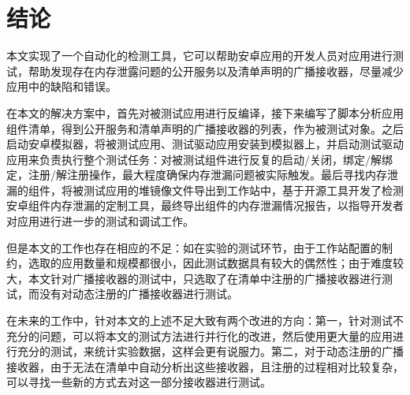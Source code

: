 \chapter{结论}\label{chapter_conclusion}
本文实现了一个自动化的检测工具，它可以帮助安卓应用的开发人员对应用进行测试，帮助发现存在内存泄露问题的公开服务以及清单声明的广播接收器，尽量减少应用中的缺陷和错误。

在本文的解决方案中，首先对被测试应用进行反编译，接下来编写了脚本分析应用组件清单，得到公开服务和清单声明的广播接收器的列表，作为被测试对象。之后启动安卓模拟器，将被测试应用、测试驱动应用安装到模拟器上，并启动测试驱动应用来负责执行整个测试任务：对被测试组件进行反复的启动/关闭，绑定/解绑定，注册/解注册操作，最大程度确保内存泄漏问题被实际触发。最后寻找内存泄漏的组件，将被测试应用的堆镜像文件导出到工作站中，基于开源工具开发了检测安卓组件内存泄漏的定制工具，最终导出组件的内存泄漏情况报告，以指导开发者对应用进行进一步的测试和调试工作。

但是本文的工作也存在相应的不足：如在实验的测试环节，由于工作站配置的制约，选取的应用数量和规模都很小，因此测试数据具有较大的偶然性；由于难度较大，本文针对广播接收器的测试中，只选取了在清单中注册的广播接收器进行测试，而没有对动态注册的广播接收器进行测试。

在未来的工作中，针对本文的上述不足大致有两个改进的方向：第一，针对测试不充分的问题，可以将本文的测试方法进行并行化的改进，然后使用更大量的应用进行充分的测试，来统计实验数据，这样会更有说服力。第二，对于动态注册的广播接收器，由于无法在清单中自动分析出这些接收器，且注册的过程相对比较复杂，可以寻找一些新的方式去对这一部分接收器进行测试。
